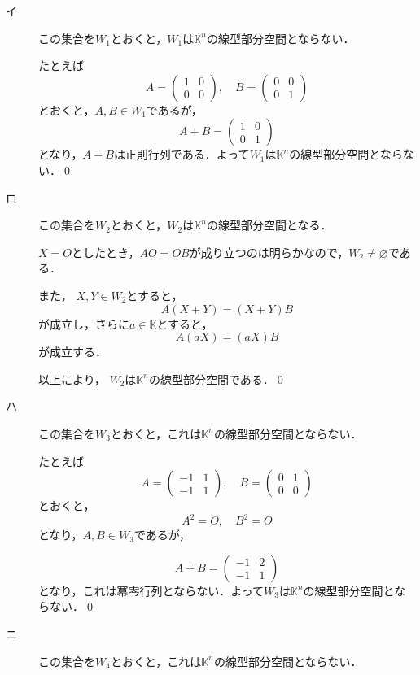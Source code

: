 \documentclass[uplatex,dvipdfmx,a4paper,10pt,fleqn]{jsarticle}
\begin{document}
\begin{leftbar}
    \begin{description}
        \item[イ] この集合を$W_1$とおくと，$W_1$は$\mathbb{K}^n$の線型部分空間とならない．
        
        たとえば
        \[
            A = \begin{pmatrix} 1 & 0 \\ 0 & 0 \end{pmatrix},\quad B = \begin{pmatrix} 0 & 0 \\ 0 & 1 \end{pmatrix}
        \]
        とおくと，$ A , B \in W_1$であるが，
        \[
            A + B = \begin{pmatrix} 1 & 0 \\ 0 & 1 \end{pmatrix}
        \]
        となり，$A+B$は正則行列である．よって$W_1$は$\mathbb{K}^n$の線型部分空間とならない．\qed 
        \item[ロ] この集合を$W_2$とおくと，$W_2$は$\mathbb{K}^n$の線型部分空間となる．
        
        $X =O$としたとき，$A O = OB$が成り立つのは明らかなので，$ W_2 \ne \varnothing$である．

        また， $X,Y \in W_2$とすると，
        \[
            A(X+Y)=(X+Y)B 
        \]
        が成立し，さらに$ a\in \mathbb{K}$とすると，
        \[
            A(aX)=(aX)B
        \]
        が成立する．

        以上により， $W_2$は$\mathbb{K}^n$の線型部分空間である．\qed 
        \item[ハ] この集合を$W_3$とおくと，これは$\mathbb{K}^n$の線型部分空間とならない．
        
        たとえば
        \[
            A = \begin{pmatrix} -1 & 1 \\ -1 & 1 \end{pmatrix} , \quad B = \begin{pmatrix} 0 & 1 \\ 0 & 0 \end{pmatrix}
        \]
        とおくと，
        \[
            A^2 = O , \quad B^2 =O
        \]
        となり，$A ,B \in W_3$であるが，

        \[
            A+B = \begin{pmatrix} -1 & 2\\-1 & 1\end{pmatrix}
        \]
        となり，これは冪零行列とならない．よって$W_3$は$\mathbb{K}^n$の線型部分空間とならない．\qed 
        \item[ニ]この集合を$W_4$とおくと，これは$\mathbb{K}^n$の線型部分空間とならない．
        

\end{description}
\end{leftbar}
\end{document}
